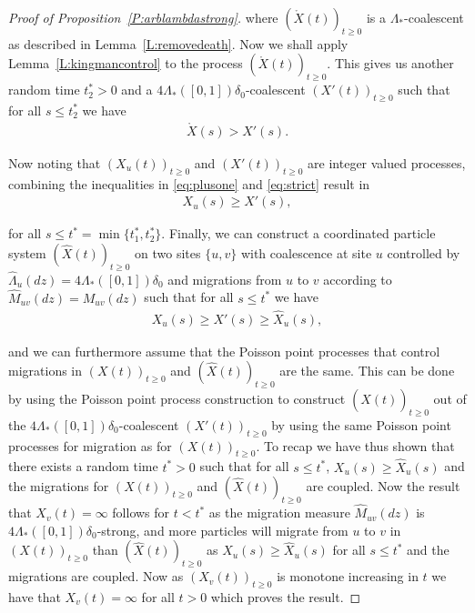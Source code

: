 \documentclass[11pt]{article}
\theoremstyle{definition}
\newcommand{\lemref}[1]{Lemma~\ref{L:#1}}
\newcommand{\propref}[1]{Proposition~\ref{P:#1}}
\begin{document}
\begin{proof}[Proof of \propref{arblambdastrong}]
    \noindent where $(\mathring{X}(t))_{t \geq 0}$ is a $\Lambda_*$-coalescent as described in \lemref{removedeath}. Now we shall apply \lemref{kingmancontrol} to the process $(\mathring{X}(t))_{t \geq 0}$. This gives us another random time $t^*_2 > 0$ and a $4\Lambda_*([0,1])\delta_0$-coalescent $(X'(t))_{t \geq 0}$ such that for all $s \leq t^*_2$ we have
    \begin{align}\label{eq:strict}
        \mathring{X}(s) > X'(s).
    \end{align}

    \noindent Now noting that $(X_u(t))_{t \geq 0}$ and $(X'(t))_{t \geq 0}$ are integer valued processes, combining the inequalities in \eqref{eq:plusone} and \eqref{eq:strict} result in
    \begin{align*}
        X_u(s) \geq X'(s),
    \end{align*}

    \noindent for all $s \leq t^* = \min\{t_1^*, t_2^*\}$. Finally, we can construct a coordinated particle system $(\widehat{X}(t))_{t \geq 0}$ on two sites $\{u,v\}$ with coalescence at site $u$ controlled by $\widehat{\Lambda}_u(dz) = 4\Lambda_*([0,1])\delta_0$ and migrations from $u$ to $v$ according to $\widehat{M}_{uv}(dz) = M_{uv}(dz)$ such that for all $s \leq t^*$ we have
    \begin{align*}
        X_u(s) \geq X'(s) \geq \widehat{X}_u(s),
    \end{align*}

    \noindent and we can furthermore assume that the Poisson point processes that control migrations in $(X(t))_{t \geq 0}$ and $(\widehat{X}(t))_{t \geq 0}$ are the same. This can be done by using the Poisson point process construction to construct $(\widehat{X}(t))_{t \geq 0}$ out of the $4\Lambda_*([0,1])\delta_0$-coalescent $(X'(t))_{t \geq 0}$ by using the same Poisson point processes for migration as for $(X(t))_{t \geq 0}$. To recap we have thus shown that there exists a random time $t^* > 0$ such that for all $s \leq t^*$, $X_u(s) \geq \widehat{X}_u(s)$ and the migrations for $(X(t))_{t \geq 0}$ and $(\widehat{X}(t))_{t \geq 0}$ are coupled. Now the result that $X_v(t) = \infty$ follows for $t < t^*$ as the migration measure $\widehat{M}_{uv}(dz)$ is $4\Lambda_*([0,1])\delta_0$-strong, and more particles will migrate from $u$ to $v$ in $(X(t))_{t \geq 0}$ than $(\widehat{X}(t))_{t \geq 0}$ as $X_u(s) \geq \widehat{X}_u(s)$ for all $s \leq t^*$ and the migrations are coupled. Now as $(X_v(t))_{t \geq 0}$ is monotone increasing in $t$ we have that $X_v(t) = \infty$ for all $t > 0$ which proves the result. 
\end{proof}
\end{document}
